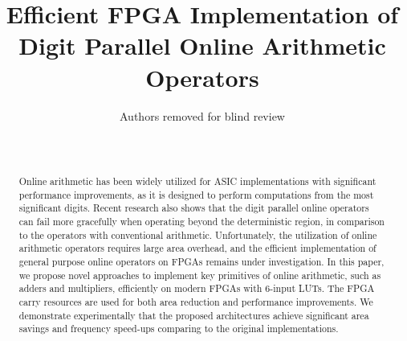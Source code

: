 \documentclass[conference]{IEEEtran}
\begin{document}
\title{Efficient FPGA Implementation of\\ Digit Parallel Online Arithmetic Operators}


\author{Authors removed for blind review\\ \\ \\}

\maketitle


\begin{abstract}
Online arithmetic has been widely utilized for ASIC implementations with significant performance improvements, as it is designed to perform computations from the most significant digits. Recent research also shows that the digit parallel online operators can fail more gracefully when operating beyond the deterministic region, in comparison to the operators with conventional arithmetic. Unfortunately, the utilization of online arithmetic operators requires large area overhead, and the efficient implementation of general purpose online operators on FPGAs remains under investigation. In this paper, we propose novel approaches to implement key primitives of online arithmetic, such as adders and multipliers, efficiently on modern FPGAs with 6-input LUTs. The FPGA carry resources are used for both area reduction and performance improvements. We demonstrate experimentally that the proposed architectures achieve significant area savings and frequency speed-ups comparing to the original implementations.





\end{abstract}
\end{document}
